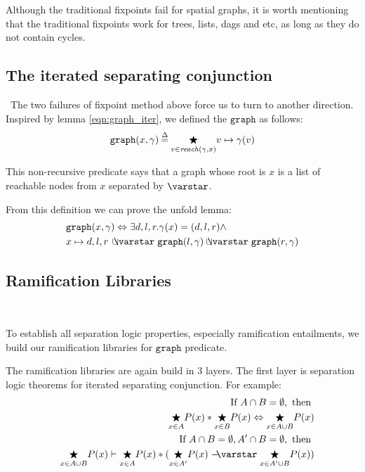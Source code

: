 Although the traditional fixpoints fail for spatial graphs, it is
worth mentioning that the traditional fixpoints work for trees, lists,
dags and etc, as long as they do not contain cycles.

\subsection{The iterated separating conjunction}\
The two failures of fixpoint method above force us to turn to another
direction. Inspired by lemma \ref{eqn:graph_iter}, we defined the
$\mathtt{graph}$ as follows:
\begin{equation}\label{eqn:iter_def}
  \mathtt{graph}(x, \gamma)\mathbin{\stackrel{\Delta}{=}}\underset{v\in\mathit{reach}(\gamma, x)}{\bigstar} v\mapsto\gamma(v)
\end{equation}

This non-recursive predicate says that a graph whose root is $x$ is a
list of reachable nodes from $x$ separated by $\scon$.

\label{sec:foldunfold} From this definition we can prove the unfold lemma:
\begin{equation}\label{eqn:unfold_graph}
  \begin{split}
  & \mathtt{graph}(x, \gamma) \Leftrightarrow \exists d,l,r
    . \gamma(x)=(d,l,r) \wedge \\ & x \mapsto d,l,r\, \ocon
    \mathtt{graph}(l, \gamma) \ocon \mathtt{graph}(r, \gamma)
  \end{split}
\end{equation}


\subsection{Ramification Libraries}\

To establish all separation logic properties, especially ramification entailments, we build our ramification libraries for $\mathtt{graph}$ predicate.

The ramification libraries are again build in 3 layers. The first layer is separation logic theorems for iterated separating conjunction. For example:
\begin{eqnarray*}
&& \text{If }A \cap B = \emptyset, \text{ then } \\
&&  \underset{x\in A}{\bigstar} P(x) *   \underset{x\in B}{\bigstar} P(x) \Leftrightarrow \underset{x\in A \cup B}{\bigstar} P(x) \\
&& \text{If }A \cap B = \emptyset,  A' \cap B = \emptyset, \text{ then }\\
&& \underset{x\in A\cup B}{\bigstar} P(x) \vdash \underset{x\in A}{\bigstar} P(x) * ( \underset{x\in A'}{\bigstar} P(x) \wand \underset{x\in A' \cup B}{\bigstar} P(x))
\end{eqnarray*}

